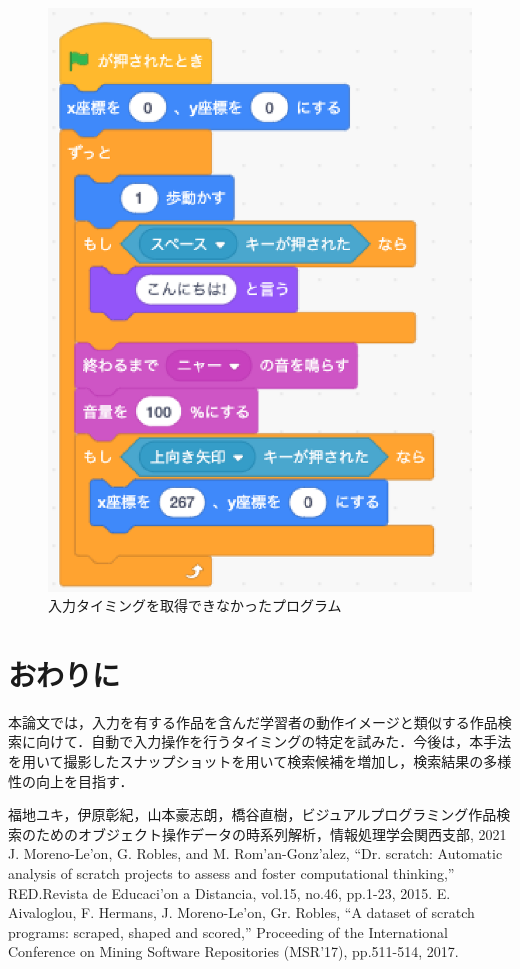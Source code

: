 \documentclass[uplatex,dvipdfmx,a4paper,twocolumn,base=11pt,jbase=11pt,ja=standard]{bxjsarticle}  %
\begin{document}
\begin{figure}
    \begin{center}
        \includegraphics[width=0.5\linewidth]{program.eps}
        \caption{入力タイミングを取得できなかったプログラム}
        \label{fig:input}
    \end{center}
\vspace{-8mm}
\end{figure}

%


\section{おわりに}

本論文では，入力を有する作品を含んだ学習者の動作イメージと類似する作品検索に向けて．自動で入力操作を行うタイミングの特定を試みた．今後は，本手法を用いて撮影したスナップショットを用いて検索候補を増加し，検索結果の多様性の向上を目指す．



\begin{thebibliography}{1}
   福地ユキ，伊原彰紀，山本豪志朗，橋谷直樹，ビジュアルプログラミング作品検索のためのオブジェクト操作データの時系列解析，情報処理学会関西支部, 2021
   J. Moreno-Le'on, G. Robles, and M. Rom'an-Gonz'alez, ``Dr. scratch: Automatic analysis of scratch projects to assess and foster computational thinking,'' RED.Revista de Educaci'on a Distancia, vol.15, no.46, pp.1-23, 2015.
   E. Aivaloglou, F. Hermans, J. Moreno-Le'on, Gr. Robles, ``A dataset of scratch programs: scraped, shaped and scored,'' Proceeding of the International Conference on Mining Software Repositories (MSR'17), pp.511-514, 2017.

\end{thebibliography}





%
\end{document}
